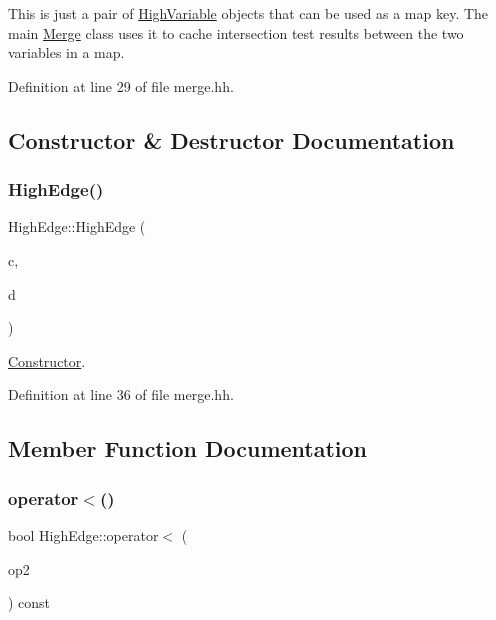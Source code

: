 This is just a pair of \mbox{\hyperlink{class_high_variable}{High\+Variable}} objects that can be used as a map key. The main \mbox{\hyperlink{class_merge}{Merge}} class uses it to cache intersection test results between the two variables in a map. 

Definition at line 29 of file merge.\+hh.



\subsection{Constructor \& Destructor Documentation}
\mbox{\label{class_high_edge_a2783357a267565b606160dd2314d74c9}} 
\subsubsection{\texorpdfstring{HighEdge()}{HighEdge()}}
{\footnotesize\ttfamily High\+Edge\+::\+High\+Edge (\begin{DoxyParamCaption}\item[{\mbox{\hyperlink{class_high_variable}{High\+Variable}} $\ast$}]{c,  }\item[{\mbox{\hyperlink{class_high_variable}{High\+Variable}} $\ast$}]{d }\end{DoxyParamCaption})\hspace{0.3cm}{\ttfamily [inline]}}



\mbox{\hyperlink{class_constructor}{Constructor}}. 



Definition at line 36 of file merge.\+hh.



\subsection{Member Function Documentation}
\mbox{\label{class_high_edge_ad4bffab9b5ea1beab4de1b0bd8b80469}} 
\subsubsection{\texorpdfstring{operator$<$()}{operator<()}}
{\footnotesize\ttfamily bool High\+Edge\+::operator$<$ (\begin{DoxyParamCaption}\item[{const \mbox{\hyperlink{class_high_edge}{High\+Edge}} \&}]{op2 }\end{DoxyParamCaption}) const\hspace{0.3cm}{\ttfamily [inline]}}



